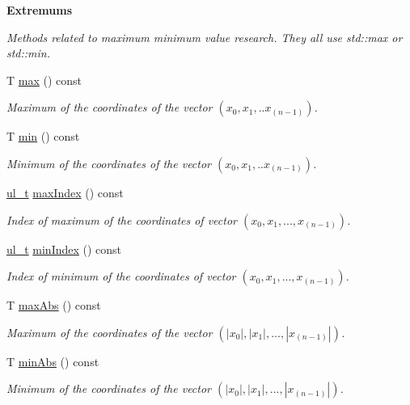 \begin{Indent}\textbf{ Extremums}\par
{\em Methods related to maximum minimum value research. They all use {\ttfamily std\+::max} or {\ttfamily std\+::min}. }\begin{DoxyCompactItemize}
\item 
T \mbox{\hyperlink{class_n_vector_afc7553743872ccb71e902a154eb60dc2}{max}} () const
\begin{DoxyCompactList}\small\item\em Maximum of the coordinates of the vector $ (x_0, x_1, .. x_{(n-1)}) $. \end{DoxyCompactList}\item 
T \mbox{\hyperlink{class_n_vector_ab81d84a1fce6b8647e5fd4e34ec90db7}{min}} () const
\begin{DoxyCompactList}\small\item\em Minimum of the coordinates of the vector $ (x_0, x_1, .. x_{(n-1)}) $. \end{DoxyCompactList}\item 
\mbox{\hyperlink{group___n_algebra_ga1b140a2034db3f5dfe18a987745df43a}{ul\+\_\+t}} \mbox{\hyperlink{class_n_vector_ab0521dd8dc4af0e9167770f85084d2d6}{max\+Index}} () const
\begin{DoxyCompactList}\small\item\em Index of maximum of the coordinates of vector $ (x_0, x_1, ..., x_{(n-1)}) $. \end{DoxyCompactList}\item 
\mbox{\hyperlink{group___n_algebra_ga1b140a2034db3f5dfe18a987745df43a}{ul\+\_\+t}} \mbox{\hyperlink{class_n_vector_aea9d0e6c8b20628b5e09f8194484a8d3}{min\+Index}} () const
\begin{DoxyCompactList}\small\item\em Index of minimum of the coordinates of vector $ (x_0, x_1, ..., x_{(n-1)}) $. \end{DoxyCompactList}\item 
T \mbox{\hyperlink{class_n_vector_a2d77a1ff10574ae5ca33fb3c11a087e2}{max\+Abs}} () const
\begin{DoxyCompactList}\small\item\em Maximum of the coordinates of the vector $ (|x_0|, |x_1|, ..., |x_{(n-1)}|) $. \end{DoxyCompactList}\item 
T \mbox{\hyperlink{class_n_vector_a857878b360cede51eb87924cd46d5a54}{min\+Abs}} () const
\begin{DoxyCompactList}\small\item\em Minimum of the coordinates of the vector $ (|x_0|, |x_1|, ..., |x_{(n-1)}|) $. \end{DoxyCompactList}\item 

\end{DoxyCompactItemize}
\end{Indent}
